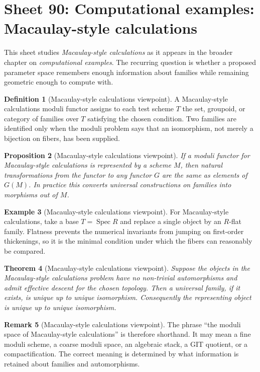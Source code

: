 \documentclass[11pt]{amsart}
\newtheorem{theorem}{Theorem}[section]
\newtheorem{proposition}[theorem]{Proposition}
\theoremstyle{definition}
\newtheorem{definition}[theorem]{Definition}
\newtheorem{example}[theorem]{Example}
\newtheorem{remark}[theorem]{Remark}
\newcommand{\Spec}{\operatorname{Spec}}
\begin{document}
\section{Sheet 90: Computational examples: Macaulay-style calculations}
This sheet studies \emph{Macaulay-style calculations} as it appears in the broader chapter on \emph{computational examples}.  The recurring question is whether a proposed parameter space remembers enough information about families while remaining geometric enough to compute with.
\begin{definition}[Macaulay-style calculations viewpoint]
A Macaulay-style calculations moduli functor assigns to each test scheme $T$ the set, groupoid, or category of families over $T$ satisfying the chosen condition.  Two families are identified only when the moduli problem says that an isomorphism, not merely a bijection on fibers, has been supplied.
\end{definition}
\begin{proposition}[Macaulay-style calculations viewpoint]
If a moduli functor for Macaulay-style calculations is represented by a scheme $M$, then natural transformations from the functor to any functor $G$ are the same as elements of $G(M)$.  In practice this converts universal constructions on families into morphisms out of $M$.
\end{proposition}
\begin{example}[Macaulay-style calculations viewpoint]
For Macaulay-style calculations, take a base $T=\Spec R$ and replace a single object by an $R$-flat family.  Flatness prevents the numerical invariants from jumping on first-order thickenings, so it is the minimal condition under which the fibers can reasonably be compared.
\end{example}
\begin{theorem}[Macaulay-style calculations viewpoint]
Suppose the objects in the Macaulay-style calculations problem have no non-trivial automorphisms and admit effective descent for the chosen topology.  Then a universal family, if it exists, is unique up to unique isomorphism.  Consequently the representing object is unique up to unique isomorphism.
\end{theorem}
\begin{remark}[Macaulay-style calculations viewpoint]
The phrase ``the moduli space of Macaulay-style calculations'' is therefore shorthand.  It may mean a fine moduli scheme, a coarse moduli space, an algebraic stack, a GIT quotient, or a compactification.  The correct meaning is determined by what information is retained about families and automorphisms.
\end{remark}
\end{document}
